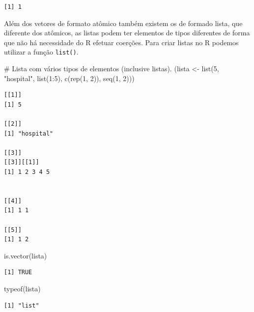 \documentclass[
  letterpaper,
  DIV=11,
  numbers=noendperiod]{scrreprt}
\newenvironment{Shaded}{\begin{snugshade}}{\end{snugshade}}
\newcommand{\CommentTok}[1]{\textcolor[rgb]{0.37,0.37,0.37}{#1}}
\newcommand{\DecValTok}[1]{\textcolor[rgb]{0.68,0.00,0.00}{#1}}
\newcommand{\FunctionTok}[1]{\textcolor[rgb]{0.28,0.35,0.67}{#1}}
\newcommand{\NormalTok}[1]{\textcolor[rgb]{0.00,0.23,0.31}{#1}}
\newcommand{\OtherTok}[1]{\textcolor[rgb]{0.00,0.23,0.31}{#1}}
\newcommand{\SpecialCharTok}[1]{\textcolor[rgb]{0.37,0.37,0.37}{#1}}
\newcommand{\StringTok}[1]{\textcolor[rgb]{0.13,0.47,0.30}{#1}}
\begin{document}
\begin{verbatim}
[1] 1
\end{verbatim}

Além dos vetores de formato atômico também existem os de formado lista,
que diferente dos atômicos, as listas podem ter elementos de tipos
diferentes de forma que não há necessidade do R efetuar coerções. Para
criar listas no R podemos utilizar a função \texttt{list()}.

\begin{Shaded}
\begin{Highlighting}[]
\CommentTok{\# Lista com vários tipos de elementos (inclusive listas).}
\NormalTok{(lista }\OtherTok{\textless{}{-}} \FunctionTok{list}\NormalTok{(}\DecValTok{5}\NormalTok{, }\StringTok{"hospital"}\NormalTok{, }\FunctionTok{list}\NormalTok{(}\DecValTok{1}\SpecialCharTok{:}\DecValTok{5}\NormalTok{), }\FunctionTok{c}\NormalTok{(}\FunctionTok{rep}\NormalTok{(}\DecValTok{1}\NormalTok{, }\DecValTok{2}\NormalTok{)), }\FunctionTok{seq}\NormalTok{(}\DecValTok{1}\NormalTok{, }\DecValTok{2}\NormalTok{)))}
\end{Highlighting}
\end{Shaded}

\begin{verbatim}
[[1]]
[1] 5

[[2]]
[1] "hospital"

[[3]]
[[3]][[1]]
[1] 1 2 3 4 5


[[4]]
[1] 1 1

[[5]]
[1] 1 2
\end{verbatim}

\begin{Shaded}
\begin{Highlighting}[]
\FunctionTok{is.vector}\NormalTok{(lista)}
\end{Highlighting}
\end{Shaded}

\begin{verbatim}
[1] TRUE
\end{verbatim}

\begin{Shaded}
\begin{Highlighting}[]
\FunctionTok{typeof}\NormalTok{(lista)}
\end{Highlighting}
\end{Shaded}

\begin{verbatim}
[1] "list"
\end{verbatim}
\end{document}
